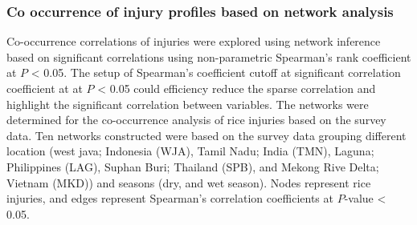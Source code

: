

\subsubsection*{Co  occurrence of injury profiles based on network analysis}

Co-occurrence correlations of injuries were explored using network inference based on significant correlations using non-parametric Spearman’s rank coefficient at $P$ < 0.05. The setup of Spearman's coefficient cutoff at significant correlation coefficient at at $P$ < 0.05 could efficiency reduce the sparse correlation and highlight the significant correlation between variables. The networks were determined for the co-occurrence analysis of rice injuries based on the survey data. Ten networks constructed were based on the survey data grouping different location (west java; Indonesia (WJA), Tamil Nadu; India (TMN), Laguna; Philippines (LAG), Suphan Buri; Thailand (SPB), and Mekong Rive Delta; Vietnam (MKD)) and seasons (dry, and wet season). Nodes represent rice injuries, and edges represent Spearman's correlation coefficients at $P$-value < 0.05. 

